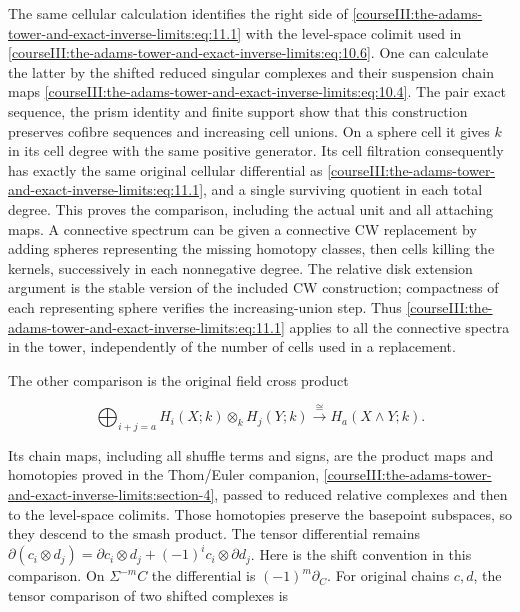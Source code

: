 The same cellular calculation identifies the right side of \eqref{courseIII:the-adams-tower-and-exact-inverse-limits:eq:11.1} with the level-space colimit used in \eqref{courseIII:the-adams-tower-and-exact-inverse-limits:eq:10.6}. One can calculate the latter by the shifted reduced singular complexes and their suspension chain maps \eqref{courseIII:the-adams-tower-and-exact-inverse-limits:eq:10.4}. The pair exact sequence, the prism identity and finite support show that this construction preserves cofibre sequences and increasing cell unions. On a sphere cell it gives \(k\) in its cell degree with the same positive generator. Its cell filtration consequently has exactly the same original cellular differential as \eqref{courseIII:the-adams-tower-and-exact-inverse-limits:eq:11.1}, and a single surviving quotient in each total degree. This proves the comparison, including the actual unit and all attaching maps. A connective spectrum can be given a connective CW replacement by adding spheres representing the missing homotopy classes, then cells killing the kernels, successively in each nonnegative degree. The relative disk extension argument is the stable version of the included CW construction; compactness of each representing sphere verifies the increasing-union step. Thus \eqref{courseIII:the-adams-tower-and-exact-inverse-limits:eq:11.1} applies to all the connective spectra in the tower, independently of the number of cells used in a replacement.

The other comparison is the original field cross product

\begin{equation}
\bigoplus_{i+j=a} H_i(X;k)\otimes_k H_j(Y;k)
   \xrightarrow{\cong}H_a(X\wedge Y;k).
 \label{courseIII:the-adams-tower-and-exact-inverse-limits:eq:11.2}
\end{equation}

Its chain maps, including all shuffle terms and signs, are the product maps and homotopies proved in the Thom/Euler companion, \cref{courseIII:the-adams-tower-and-exact-inverse-limits:section-4}, passed to reduced relative complexes and then to the level-space colimits. Those homotopies preserve the basepoint subspaces, so they descend to the smash product. The tensor differential remains
\(\partial(c_i\otimes d_j)=\partial c_i\otimes d_j+(-1)^i c_i\otimes\partial d_j\).
Here is the shift convention in this comparison. On \(\Sigma^{-m}C\) the differential is \((-1)^m\partial_C\). For original chains \(c,d\), the tensor comparison of two shifted complexes is

